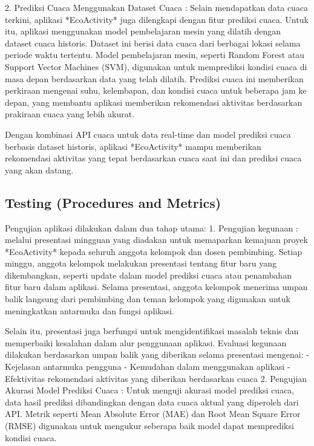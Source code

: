 \documentclass[journal,article,submit,pdftex,moreauthors]{Definitions/mdpi}
\begin{document}
2. Prediksi Cuaca Menggunakan Dataset Cuaca : 
   Selain mendapatkan data cuaca terkini, aplikasi *EcoActivity* juga dilengkapi dengan fitur prediksi cuaca. Untuk itu, aplikasi menggunakan model pembelajaran mesin yang dilatih dengan dataset cuaca historis. Dataset ini berisi data cuaca dari berbagai lokasi selama periode waktu tertentu. Model pembelajaran mesin, seperti Random Forest atau Support Vector Machines (SVM), digunakan untuk memprediksi kondisi cuaca di masa depan berdasarkan data yang telah dilatih. Prediksi cuaca ini memberikan perkiraan mengenai suhu, kelembapan, dan kondisi cuaca untuk beberapa jam ke depan, yang membantu aplikasi memberikan rekomendasi aktivitas berdasarkan prakiraan cuaca yang lebih akurat.

Dengan kombinasi API cuaca untuk data real-time dan model prediksi cuaca berbasis dataset historis, aplikasi *EcoActivity* mampu memberikan rekomendasi aktivitas yang tepat berdasarkan cuaca saat ini dan prediksi cuaca yang akan datang.

\subsection{Testing (Procedures and Metrics)}
Pengujian aplikasi dilakukan dalam dua tahap utama:
1. Pengujian kegunaan : melalui presentasi mingguan yang diadakan untuk memaparkan kemajuan proyek *EcoActivity* kepada seluruh anggota kelompok dan dosen pembimbing. Setiap minggu, anggota kelompok melakukan presentasi tentang fitur baru yang dikembangkan, seperti update dalam model prediksi cuaca atau penambahan fitur baru dalam aplikasi. Selama presentasi, anggota kelompok menerima umpan balik langsung dari pembimbing dan teman kelompok yang digunakan untuk meningkatkan antarmuka dan fungsi aplikasi.

Selain itu, presentasi juga berfungsi untuk mengidentifikasi masalah teknis dan memperbaiki kesalahan dalam alur penggunaan aplikasi. Evaluasi kegunaan dilakukan berdasarkan umpan balik yang diberikan selama presentasi mengenai:
- Kejelasan antarmuka pengguna
- Kemudahan dalam menggunakan aplikasi
- Efektivitas rekomendasi aktivitas yang diberikan berdasarkan cuaca
2. Pengujian Akurasi Model Prediksi Cuaca : Untuk menguji akurasi model prediksi cuaca, data hasil prediksi dibandingkan dengan data cuaca aktual yang diperoleh dari API. Metrik seperti Mean Absolute Error (MAE) dan Root Mean Square Error (RMSE) digunakan untuk mengukur seberapa baik model dapat memprediksi kondisi cuaca.
\end{document}
